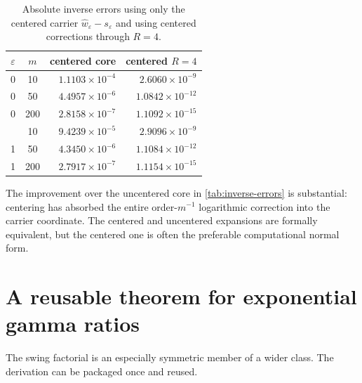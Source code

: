 \documentclass[11pt,a4paper]{article}
\theoremstyle{clean}
\theoremstyle{definition}
\newcommand{\eps}{\varepsilon}
\begin{document}
\begin{table}[htbp]
\centering
\caption{Absolute inverse errors using only the centered carrier \(\widehat w_\eps-s_\eps\) and using centered corrections through \(R=4\).}
\label{tab:centered-inverse-errors}
\small
\begin{tabular}{@{}ccrr@{}}
\toprule
\(\eps\)&\(m\)&centered core&centered \(R=4\)\\
\midrule
0&10  &\(1.1103\!\times10^{-4}\)&\(2.6060\!\times10^{-9}\)\\
0&50  &\(4.4957\!\times10^{-6}\)&\(1.0842\!\times10^{-12}\)\\
0&200 &\(2.8158\!\times10^{-7}\)&\(1.1092\!\times10^{-15}\)\\
\addlinespace
1&10  &\(9.4239\!\times10^{-5}\)&\(2.9096\!\times10^{-9}\)\\
1&50  &\(4.3450\!\times10^{-6}\)&\(1.1084\!\times10^{-12}\)\\
1&200 &\(2.7917\!\times10^{-7}\)&\(1.1154\!\times10^{-15}\)\\
\bottomrule
\end{tabular}
\end{table}

The improvement over the uncentered core in \cref{tab:inverse-errors} is substantial: centering has absorbed the entire order-\(m^{-1}\) logarithmic correction into the carrier coordinate.  The centered and uncentered expansions are formally equivalent, but the centered one is often the preferable computational normal form.

\section{A reusable theorem for exponential gamma ratios}
\label{sec:general-gamma-ratio}

The swing factorial is an especially symmetric member of a wider class.  The derivation can be packaged once and reused.
\end{document}
